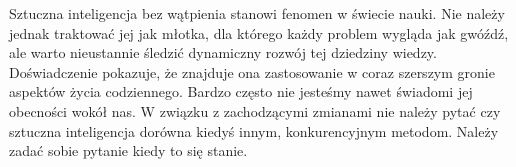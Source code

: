 \documentclass[10pt, a4paper, twoside, notitlepage, openright]{article}
\begin{document}
  Sztuczna inteligencja bez wątpienia stanowi fenomen w świecie nauki. Nie należy jednak
  traktować jej jak młotka, dla którego każdy problem wygląda jak gwóźdź, ale warto
  nieustannie śledzić dynamiczny rozwój tej dziedziny wiedzy. Doświadczenie pokazuje,
  że znajduje ona zastosowanie w coraz szerszym gronie aspektów życia codziennego.
  Bardzo często nie jesteśmy nawet świadomi jej obecności wokół nas. W związku z
  zachodzącymi zmianami nie należy pytać czy sztuczna inteligencja dorówna kiedyś
  innym, konkurencyjnym metodom. Należy zadać sobie pytanie kiedy to się stanie.






\end{document}
